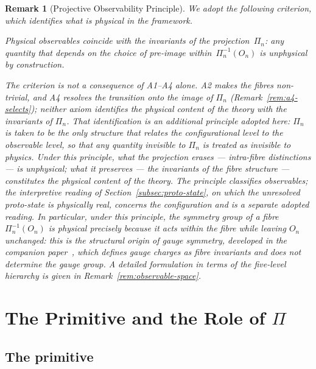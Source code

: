 \documentclass[11pt,a4paper]{article}
\newtheorem{remark}[theorem]{Remark}
\begin{document}
  \begin{remark}[Projective Observability Principle]
    \label{rem:projective-observability}
    We adopt the following criterion, which identifies what is physical in the framework.

    \emph{Physical observables coincide with the invariants of the projection~$\Pi_n$:
    any quantity that depends on the choice of pre-image within~$\Pi_n^{-1}(O_n)$
      is unphysical by construction.}

    The criterion is not a consequence of A1--A4 alone.
    A2 makes the fibres non-trivial, and A4 resolves the transition onto the image of $\Pi_n$
    (Remark~\ref{rem:a4-selects}); neither axiom identifies the physical content of the theory with the
    invariants of $\Pi_n$.
    That identification is an additional principle adopted here: $\Pi_n$ is taken to be the only structure
    that relates the configurational level to the observable level, so that any quantity invisible to
    $\Pi_n$ is treated as invisible to physics.
    Under this principle, what the projection erases --- intra-fibre distinctions --- is unphysical;
    what it preserves --- the invariants of the fibre structure --- constitutes the
    physical content of the theory.
    The principle classifies observables; the interpretive reading of Section~\ref{subsec:proto-state}, on
    which the unresolved proto-state is physically real, concerns the configuration and is a separate adopted
    reading.
    In particular, under this principle, the symmetry group of a fibre $\Pi_n^{-1}(O_n)$ is physical precisely
    because it acts within the fibre while leaving $O_n$ unchanged: this is the structural
    origin of gauge symmetry, developed in the companion paper~\cite{Beau2026q6a}, which defines gauge charges as
    fibre invariants and does not determine the gauge group.
    A detailed formulation in terms of the five-level hierarchy is given in
    Remark~\ref{rem:observable-space}.
  \end{remark}

  \clearpage
  \section{The Primitive and the Role of $\Pi$}
  \label{sec:primitive}

  \subsection{The primitive}
\end{document}
